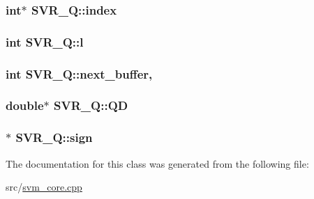 \subsubsection[{index}]{\setlength{\rightskip}{0pt plus 5cm}int$\ast$ S\+V\+R\+\_\+\+Q\+::index\hspace{0.3cm}{\ttfamily [private]}}\hypertarget{classSVR__Q_a29e769c577358f518182ba3cbe255817}{}\label{classSVR__Q_a29e769c577358f518182ba3cbe255817}
\subsubsection[{l}]{\setlength{\rightskip}{0pt plus 5cm}int S\+V\+R\+\_\+\+Q\+::l\hspace{0.3cm}{\ttfamily [private]}}\hypertarget{classSVR__Q_aa3420dab3d0b1eabdc0614c71321ab3c}{}\label{classSVR__Q_aa3420dab3d0b1eabdc0614c71321ab3c}
\subsubsection[{next\+\_\+buffer}]{\setlength{\rightskip}{0pt plus 5cm}int S\+V\+R\+\_\+\+Q\+::next\+\_\+buffer\hspace{0.3cm}{\ttfamily [mutable]}, {\ttfamily [private]}}\hypertarget{classSVR__Q_acbdbde823b714d30097648c9dc109524}{}\label{classSVR__Q_acbdbde823b714d30097648c9dc109524}
\subsubsection[{QD}]{\setlength{\rightskip}{0pt plus 5cm}double$\ast$ S\+V\+R\+\_\+\+Q\+::\+QD\hspace{0.3cm}{\ttfamily [private]}}\hypertarget{classSVR__Q_aaa4a8b37dbc15610de7fe46df8874e25}{}\label{classSVR__Q_aaa4a8b37dbc15610de7fe46df8874e25}
\subsubsection[{sign}]{$\ast$ S\+V\+R\+\_\+\+Q\+::sign\hspace{0.3cm}{\ttfamily [private]}}\hypertarget{classSVR__Q_a0255ad0a00ef589c69adc19a06527dfc}{}\label{classSVR__Q_a0255ad0a00ef589c69adc19a06527dfc}


The documentation for this class was generated from the following file\+:\begin{DoxyCompactItemize}
\item 
src/\hyperlink{svm__core_8cpp}{svm\+\_\+core.\+cpp}\end{DoxyCompactItemize}
